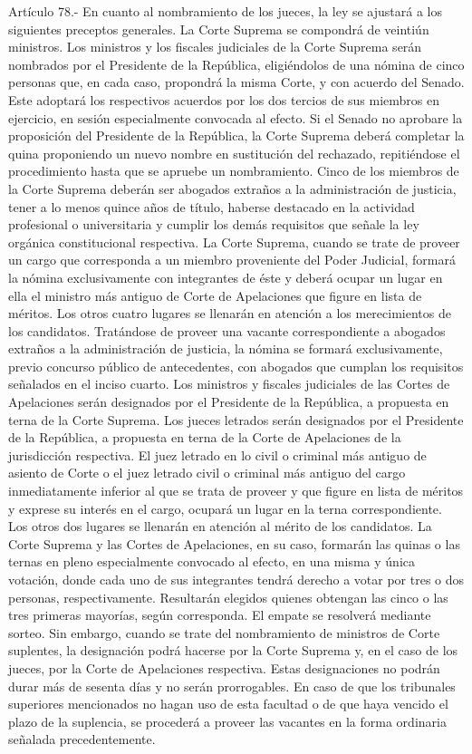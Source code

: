     Artículo 78.- En cuanto al nombramiento de los jueces, la ley se ajustará a los siguientes preceptos generales.
    La Corte Suprema se compondrá de veintiún ministros.
    Los ministros y los fiscales judiciales de la Corte Suprema serán nombrados por el Presidente de la República, eligiéndolos de una nómina de cinco personas que, en cada caso, propondrá la misma Corte, y con acuerdo del Senado. Este adoptará los respectivos acuerdos por los dos tercios de sus miembros en ejercicio, en sesión especialmente convocada al efecto. Si el Senado no aprobare la proposición del Presidente de la República, la Corte Suprema deberá completar la quina proponiendo un nuevo nombre en sustitución del rechazado, repitiéndose el procedimiento hasta que se apruebe un nombramiento.
    Cinco de los miembros de la Corte Suprema deberán ser abogados extraños a la administración de justicia, tener a lo menos quince años de título, haberse destacado en la actividad profesional o universitaria y cumplir los demás requisitos que señale la ley orgánica constitucional respectiva.
    La Corte Suprema, cuando se trate de proveer un cargo que corresponda a un miembro proveniente del Poder Judicial, formará la nómina exclusivamente con integrantes de éste y deberá ocupar un lugar en ella el ministro más antiguo de Corte de Apelaciones que figure en lista de méritos. Los otros cuatro lugares se llenarán en atención a los merecimientos de los candidatos. Tratándose de proveer una vacante correspondiente a abogados extraños a la administración de justicia, la nómina se formará exclusivamente, previo concurso público de antecedentes, con abogados que cumplan los requisitos señalados en el inciso cuarto.
    Los ministros y fiscales judiciales de las Cortes de Apelaciones serán designados por el Presidente de la República, a propuesta en terna de la Corte Suprema.
    Los jueces letrados serán designados por el Presidente de la República, a propuesta en terna de la Corte de Apelaciones de la jurisdicción respectiva.
    El juez letrado en lo civil o criminal más antiguo de asiento de Corte o el juez letrado civil o criminal más antiguo del cargo inmediatamente inferior al que se trata de proveer y que figure en lista de méritos y exprese su interés en el cargo, ocupará un lugar en la terna correspondiente. Los otros dos lugares se llenarán en atención al mérito de los candidatos.
    La Corte Suprema y las Cortes de Apelaciones, en su caso, formarán las quinas o las ternas en pleno especialmente convocado al efecto, en una misma y única votación, donde cada uno de sus integrantes tendrá derecho a votar por tres o dos personas, respectivamente. Resultarán elegidos quienes obtengan las cinco o las tres primeras mayorías, según corresponda. El empate se resolverá mediante sorteo.
    Sin embargo, cuando se trate del nombramiento de ministros de Corte suplentes, la designación podrá hacerse por la Corte Suprema y, en el caso de los jueces, por la Corte de Apelaciones respectiva. Estas designaciones no podrán durar más de sesenta días y no serán prorrogables. En caso de que los tribunales superiores mencionados no hagan uso de esta facultad o de que haya vencido el plazo de la suplencia, se procederá a proveer las vacantes en la forma ordinaria señalada precedentemente.


